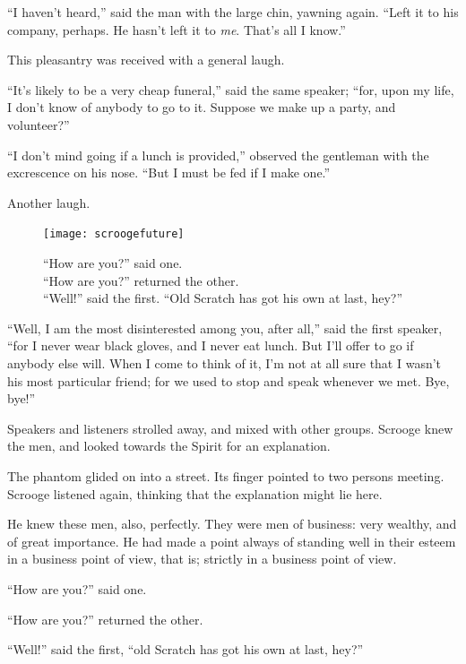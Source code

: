 \documentclass[paper=5.5in:8.5in,BCOR=7mm,twoside,DIV=calc,12pt,usegeometry]{scrbook} %
\begin{document}
\enquote{I haven't heard,} said the man with the large chin, yawning again. \enquote{Left it to his company, perhaps. He hasn't left it to \textit{me}. That's all I know.}

This pleasantry was received with a general laugh.

\enquote{It's likely to be a very cheap funeral,} said the same speaker; \enquote{for, upon my life, I don't know of anybody to go to it. Suppose we make up a party, and volunteer?}

\enquote{I don't mind going if a lunch is provided,} observed the gentleman with the excrescence on his nose. \enquote{But I must be fed if I make one.}

Another laugh.

\begin{figure}[p]
\begin{minipage}[c]{\linewidth}
\texttt{[image: scroogefuture]}
\caption[\enquote{Old Scratch has got his own at last, hey?}]{\enquote{How are you?} said one.\\
\enquote{How are you?} returned the other.\\
\enquote{Well!} said the first. \enquote{Old Scratch has got his own at last, hey?}}
\end{minipage}
\end{figure}

\enquote{Well, I am the most disinterested among you, after all,} said the first speaker, \enquote{for I never wear black gloves, and I never eat lunch. But I'll offer to go if anybody else will. When I come to think of it, I'm not at all sure that I wasn't his most particular friend; for we used to stop and speak whenever we met. Bye, bye!}

Speakers and listeners strolled away, and mixed with other groups. Scrooge knew the men, and looked towards the Spirit for an explanation.

The phantom glided on into a street. Its finger pointed to two persons meeting. Scrooge listened again, thinking that the explanation might lie here.

He knew these men, also, perfectly. They were men of business: very wealthy, and of great importance. He had made a point always of standing well in their esteem in a business point of view, that is; strictly in a business point of view.

\enquote{How are you?} said one.

\enquote{How are you?} returned the other.

\enquote{Well!} said the first, \enquote{old Scratch has got his own at last, hey?}
\end{document}
